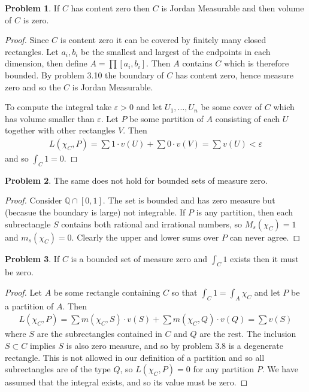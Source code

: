 \documentclass[20pt]{article}
\theoremstyle{plain}
\theoremstyle{definition}
\newtheorem*{problem}{Problem}
\newcommand{\rationals}{\mathbb{Q}}
\begin{document}
\begin{problem}{3.15}
  If $C$ has content zero then $C$ is Jordan Measurable and 
  then volume of $C$ is zero.
\end{problem}

\begin{proof}
  Since $C$ is content zero it can be covered by finitely many closed rectangles.
  Let $a_i, b_i$ be the smallest and largest of the endpoints in each dimension,
  then define $A = \prod [a_i, b_i].$ Then $A$ contains $C$ which is therefore bounded.
  By problem 3.10 the boundary of $C$ has content zero, hence measure zero and so
  the $C$ is Jordan Measurable.

  To compute the integral take $\varepsilon > 0$ and let 
  $U_1, ..., U_n$ be some cover of $C$ which has volume smaller than $\varepsilon.$
  Let $P$ be some partition of $A$ consisting 
  of each $U$ together with other rectangles $V$.
  Then 
  \begin{align*}
    L(\chi_C, P) = \sum 1 \cdot v(U) + \sum 0 \cdot v(V) = \sum v(U) < \varepsilon
  \end{align*}
  and so $\int_C 1 = 0.$

\end{proof}

\begin{problem}{3.16}
  The same does not hold for bounded sets of measure zero.
\end{problem}

\begin{proof}
  Consider $\rationals \cap [0,1].$  The set is bounded and has zero measure but 
  (becasue the boundary is large) not integrable. 
  If $P$ is any partition, then each subrectangle $S$ contains both rational and
  irrational numbers, so $M_s(\chi_C) = 1$ and $m_s(\chi_C) = 0.$  Clearly the upper and lower 
  sums over $P$ can never agree.
\end{proof}

\begin{problem}{3.17}
  If $C$ is a bounded set of measure zero and $\int_C 1$ exists then it must be zero.
\end{problem}

\begin{proof}
  Let $A$ be some rectangle containing $C$ so that $\int_C 1 = \int_A \chi_C$
  and let $P$ be a partition of $A$.  Then 
  \begin{align*}
    L(\chi_C, P) = 
    \sum m(\chi_C, S)\cdot v(S) + \sum m(\chi_C, Q) \cdot v(Q) = 
    \sum v(S)
  \end{align*}
  where $S$ are the subrectangles contained in $C$ and $Q$ are the rest.
  The inclusion $S \subset C$ implies $S$ is also zero measure, and 
  so by problem 3.8 is a degenerate rectangle. This is not allowed in 
  our definition of a partition and so all subrectangles 
  are of the type $Q$, so $L(\chi_C, P) = 0$ for any partition $P$.
  We have assumed that the integral exists, and so its value must be zero.
\end{proof}
\end{document}
